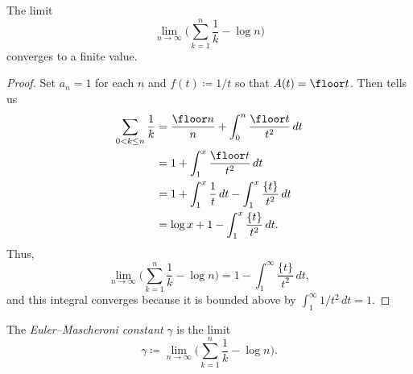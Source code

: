 \documentclass[../notes.tex]{subfiles}
\begin{document}
\begin{proposition}
	The limit
	\[\lim_{n\to\infty}\Bigg(\sum_{k=1}^n\frac1k-\log n\Bigg)\]
	converges to a finite value.
\end{proposition}
\begin{proof}
	Set $a_n=1$ for each $n$ and $f(t)\coloneqq1/t$ so that $A(t)=\floor t$. Then  tells us
	\begin{align*}
		\sum_{0<k\le n}\frac1k &= \frac{\floor n}n+\int_0^n\frac{\floor t}{t^2}\,dt \\
		&= 1+\int_1^x\frac{\floor t}{t^2}\,dt \\
		&= 1+\int_1^x\frac1t\,dt-\int_1^x\frac{\{t\}}{t^2}\,dt \\
		&= \log x+1-\int_1^x\frac{\{t\}}{t^2}\,dt.
	\end{align*}
	Thus,
	\[\lim_{n\to\infty}\Bigg(\sum_{k=1}^n\frac1k-\log n\Bigg)=1-\int_1^\infty\frac{\{t\}}{t^2}\,dt,\]
	and this integral converges because it is bounded above by $\int_1^\infty1/t^2\,dt=1$.
\end{proof}
\begin{definition}
	The \textit{Euler--Mascheroni constant} $\gamma$ is the limit
	\[\gamma\coloneqq\lim_{n\to\infty}\Bigg(\sum_{k=1}^n\frac1k-\log n\Bigg).\]
\end{definition}
\end{document}
